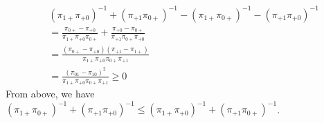 \begin{itemize}
\begin{align*}
		&(\pi_{1+}\pi_{+0})^{-1} + (\pi_{+1}\pi_{0+})^{-1} - (\pi_{1+}\pi_{0+})^{-1} - (\pi_{+1}\pi_{+0})^{-1}\\
		&= \frac{\pi_{0+}- \pi_{+0}}{\pi_{1+}\pi_{+0}\pi_{0+}} + \frac{\pi_{+0} - \pi_{0+}}{\pi_{+1}\pi_{0+}\pi_{+0}}\\
		&= \frac{(\pi_{0+}-\pi_{+0})(\pi_{+1}-\pi_{1+})}{\pi_{1+}\pi_{+0}\pi_{0+}\pi_{+1}}\\
		&=  \frac{(\pi_{01}-\pi_{10})^2}{\pi_{1+}\pi_{+0}\pi_{0+}\pi_{+1}} \geq 0
	\end{align*}
	From above, we have $(\pi_{1+}\pi_{0+})^{-1} + (\pi_{+1}\pi_{+0})^{-1} \leq (\pi_{1+}\pi_{+0})^{-1} + (\pi_{+1}\pi_{0+})^{-1}$.
\end{itemize}